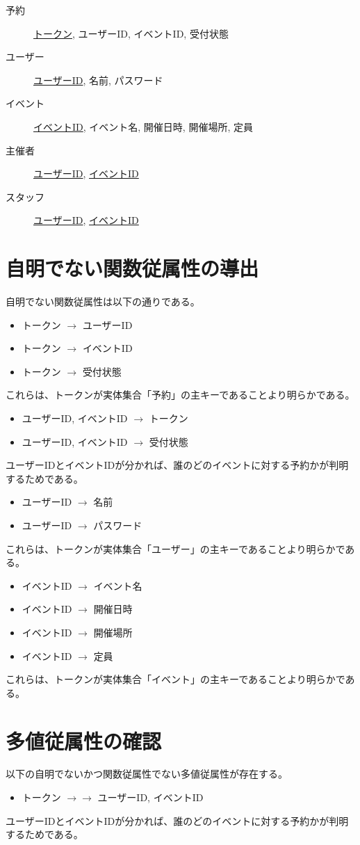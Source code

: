 \documentclass[dvipdfmx]{jarticle}
\begin{document}
\begin{description}
  \item[予約] \underline{トークン}, ユーザーID, イベントID, 受付状態
  \item[ユーザー] \underline{ユーザーID}, 名前, パスワード
  \item[イベント] \underline{イベントID}, イベント名, 開催日時, 開催場所, 定員
  \item[主催者] \underline{ユーザーID}, \underline{イベントID}  
  \item[スタッフ] \underline{ユーザーID}, \underline{イベントID}
\end{description}

\section{自明でない関数従属性の導出}
自明でない関数従属性は以下の通りである。
\begin{itemize}
  \item {トークン} $\rightarrow$ {ユーザーID}
  \item {トークン} $\rightarrow$ {イベントID}
  \item {トークン} $\rightarrow$ {受付状態}
\end{itemize}
これらは、トークンが実体集合「予約」の主キーであることより明らかである。
\begin{itemize}
  \item {ユーザーID, イベントID} $\rightarrow$ {トークン}
  \item {ユーザーID, イベントID} $\rightarrow$ {受付状態}
\end{itemize}
ユーザーIDとイベントIDが分かれば、誰のどのイベントに対する予約かが判明するためである。
\begin{itemize}
  \item {ユーザーID} $\rightarrow$ {名前}
  \item {ユーザーID} $\rightarrow$ {パスワード}
\end{itemize}
これらは、トークンが実体集合「ユーザー」の主キーであることより明らかである。
\begin{itemize}
  \item {イベントID} $\rightarrow$ {イベント名}
  \item {イベントID} $\rightarrow$ {開催日時}
  \item {イベントID} $\rightarrow$ {開催場所}
  \item {イベントID} $\rightarrow$ {定員}
\end{itemize}
これらは、トークンが実体集合「イベント」の主キーであることより明らかである。

\section{多値従属性の確認}
以下の自明でないかつ関数従属性でない多値従属性が存在する。
\begin{itemize}
  \item {トークン} $\rightarrow \rightarrow$ {ユーザーID, イベントID}
\end{itemize}
ユーザーIDとイベントIDが分かれば、誰のどのイベントに対する予約かが判明するためである。
\end{document}
